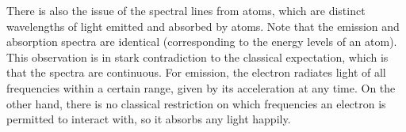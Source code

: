 There is also the issue of the spectral lines from atoms, which are distinct wavelengths of light emitted and absorbed by atoms.
Note that the emission and absorption spectra are identical (corresponding to the energy levels of an atom).
This observation is in stark contradiction to the classical expectation, which is that the spectra are continuous.
For emission, the electron radiates light of all frequencies within a certain range, given by its acceleration at any time.
On the other hand, there is no classical restriction on which frequencies an electron is permitted to interact with, so it absorbs any light happily.






